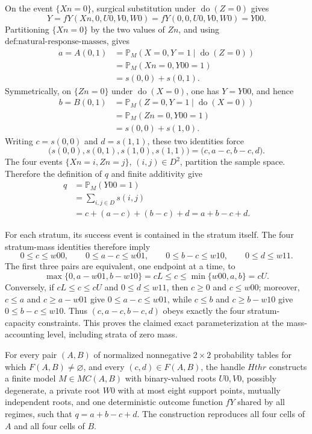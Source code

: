 On the event \(\{Xn=0\}\), surgical substitution under \(\operatorname{do}(Z=0)\) gives
\[
Y=fY(Xn,0,U0,V0,W0)=fY(0,0,U0,V0,W0)=Y00.
\]
Partitioning \(\{Xn=0\}\) by the two values of \(Zn\), and using \(\text{def:natural-response-masses}\), gives
\[
\begin{aligned}
a=A(0,1)
&=\mathbb P_M(X=0,Y=1\mid\operatorname{do}(Z=0))\\
&=\mathbb P_M(Xn=0,Y00=1)\\
&=s(0,0)+s(0,1).
\end{aligned}
\]
Symmetrically, on \(\{Zn=0\}\) under \(\operatorname{do}(X=0)\), one has \(Y=Y00\), and hence
\[
\begin{aligned}
b=B(0,1)
&=\mathbb P_M(Z=0,Y=1\mid\operatorname{do}(X=0))\\
&=\mathbb P_M(Zn=0,Y00=1)\\
&=s(0,0)+s(1,0).
\end{aligned}
\]
Writing \(c=s(0,0)\) and \(d=s(1,1)\), these two identities force
\[
\bigl(s(0,0),s(0,1),s(1,0),s(1,1)\bigr)
=\bigl(c,a-c,b-c,d\bigr).
\]
The four events \(\{Xn=i,Zn=j\}\), \((i,j)\in D^2\), partition the sample space.  Therefore the definition of \(q\) and finite additivity give
\[
\begin{aligned}
q
&=\mathbb P_M(Y00=1)\\
&=\sum_{i,j\in D}s(i,j)\\
&=c+(a-c)+(b-c)+d=a+b-c+d.
\end{aligned}
\]

For each stratum, its success event is contained in the stratum itself.  The four stratum-mass identities therefore imply
\[
0\le c\le w00,\qquad
0\le a-c\le w01,\qquad
0\le b-c\le w10,\qquad
0\le d\le w11.
\]
The first three pairs are equivalent, one endpoint at a time, to
\[
\max\{0,a-w01,b-w10\}=cL
\le c\le
\min\{w00,a,b\}=cU.
\]
Conversely, if \(cL\le c\le cU\) and \(0\le d\le w11\), then \(c\ge0\) and \(c\le w00\); moreover, \(c\le a\) and \(c\ge a-w01\) give \(0\le a-c\le w01\), while \(c\le b\) and \(c\ge b-w10\) give \(0\le b-c\le w10\).  Thus \((c,a-c,b-c,d)\) obeys exactly the four stratum-capacity constraints.  This proves the claimed exact parameterization at the mass-accounting level, including strata of zero mass.

For every pair \((A,B)\) of normalized nonnegative \(2\times2\) probability tables for which \(F(A,B)\ne\varnothing\), and every \((c,d)\in F(A,B)\), the handle \(Hthr\) constructs a finite model \(M\in MC(A,B)\) with binary-valued roots \(U0,V0\), possibly degenerate, a private root \(W0\) with at most eight support points, mutually independent roots, and one deterministic outcome function \(fY\) shared by all regimes, such that \(q=a+b-c+d\).  The construction reproduces all four cells of \(A\) and all four cells of \(B\).

